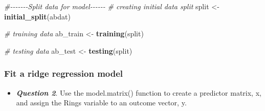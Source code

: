 \documentclass[
]{article}
\newenvironment{Shaded}{\begin{snugshade}}{\end{snugshade}}
\newcommand{\CommentTok}[1]{\textcolor[rgb]{0.56,0.35,0.01}{\textit{#1}}}
\newcommand{\FunctionTok}[1]{\textcolor[rgb]{0.13,0.29,0.53}{\textbf{#1}}}
\newcommand{\NormalTok}[1]{#1}
\newcommand{\OtherTok}[1]{\textcolor[rgb]{0.56,0.35,0.01}{#1}}
\providecommand{\tightlist}{%
  \setlength{\itemsep}{0pt}\setlength{\parskip}{0pt}}
\begin{document}
\begin{Shaded}
\begin{Highlighting}[]
\CommentTok{\#{-}{-}{-}{-}{-}{-}{-}Split data for model{-}{-}{-}{-}{-}{-}}
\CommentTok{\# creating initial data split}
\NormalTok{split }\OtherTok{\textless{}{-}} \FunctionTok{initial\_split}\NormalTok{(abdat)}

\CommentTok{\# training data}
\NormalTok{ab\_train }\OtherTok{\textless{}{-}} \FunctionTok{training}\NormalTok{(split)}

\CommentTok{\# testing data}
\NormalTok{ab\_test }\OtherTok{\textless{}{-}} \FunctionTok{testing}\NormalTok{(split)}
\end{Highlighting}
\end{Shaded}

\hypertarget{fit-a-ridge-regression-model}{%
\subsubsection{Fit a ridge regression
model}\label{fit-a-ridge-regression-model}}

\begin{itemize}
\tightlist
\item
  \textbf{\emph{Question 2}}. Use the model.matrix() function to create
  a predictor matrix, x, and assign the Rings variable to an outcome
  vector, y.
\end{itemize}
\end{document}
